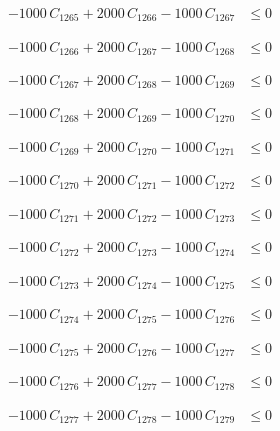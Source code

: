 \documentclass[a4paper,11pt]{article}
\begin{document}
\begin{align}
-1000\,C_{1265} + 2000\,C_{1266} - 1000\,C_{1267} &\leq 0 \nonumber
\end{align}

\begin{align}
-1000\,C_{1266} + 2000\,C_{1267} - 1000\,C_{1268} &\leq 0 \nonumber
\end{align}

\begin{align}
-1000\,C_{1267} + 2000\,C_{1268} - 1000\,C_{1269} &\leq 0 \nonumber
\end{align}

\begin{align}
-1000\,C_{1268} + 2000\,C_{1269} - 1000\,C_{1270} &\leq 0 \nonumber
\end{align}

\begin{align}
-1000\,C_{1269} + 2000\,C_{1270} - 1000\,C_{1271} &\leq 0 \nonumber
\end{align}

\begin{align}
-1000\,C_{1270} + 2000\,C_{1271} - 1000\,C_{1272} &\leq 0 \nonumber
\end{align}

\begin{align}
-1000\,C_{1271} + 2000\,C_{1272} - 1000\,C_{1273} &\leq 0 \nonumber
\end{align}

\begin{align}
-1000\,C_{1272} + 2000\,C_{1273} - 1000\,C_{1274} &\leq 0 \nonumber
\end{align}

\begin{align}
-1000\,C_{1273} + 2000\,C_{1274} - 1000\,C_{1275} &\leq 0 \nonumber
\end{align}

\begin{align}
-1000\,C_{1274} + 2000\,C_{1275} - 1000\,C_{1276} &\leq 0 \nonumber
\end{align}

\begin{align}
-1000\,C_{1275} + 2000\,C_{1276} - 1000\,C_{1277} &\leq 0 \nonumber
\end{align}

\begin{align}
-1000\,C_{1276} + 2000\,C_{1277} - 1000\,C_{1278} &\leq 0 \nonumber
\end{align}

\begin{align}
-1000\,C_{1277} + 2000\,C_{1278} - 1000\,C_{1279} &\leq 0 \nonumber
\end{align}
\end{document}
